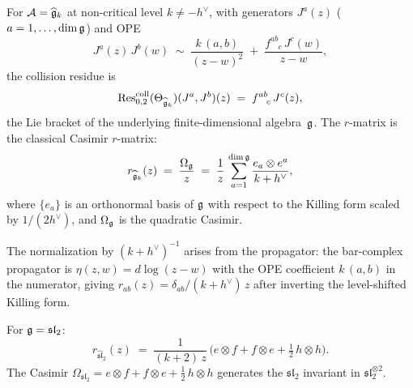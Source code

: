 \begin{computation}
For $\mathcal{A} = \widehat{\mathfrak{g}}_k$ at non-critical level
$k \neq -h^\vee$, with generators $J^a(z)$ ($a = 1,\dotsc,
\dim\mathfrak{g}$) and OPE
\[
J^a(z)\,J^b(w)
\;\sim\;
\frac{k\,(a,b)}{(z-w)^2}
\;+\;
\frac{f^{ab}_{\phantom{ab}c}\,J^c(w)}{z-w},
\]
the collision residue is
\begin{equation}%
\Rescoll_{0,2}(\Theta_{\widehat{\fg}_k})
 (J^a, J^b)(z)
\;=\;
f^{ab}_{\phantom{ab}c}\,J^c(z),
\end{equation}
the Lie bracket of the underlying finite-dimensional algebra~$\mathfrak{g}$.
The $r$-matrix is the classical Casimir $r$-matrix:
\begin{equation}%
r_{\widehat{\fg}_k}(z)
\;=\;
\frac{\Omega_\fg}{z}
\;=\;
\frac{1}{z}\,
\sum_{a=1}^{\dim\fg}
\frac{e_a \otimes e^a}{k + h^\vee},
\end{equation}
where $\{e_a\}$ is an orthonormal basis of $\mathfrak{g}$ with respect to the
Killing form scaled by $1/(2h^\vee)$, and $\Omega_{\mathfrak{g}}$ is the
quadratic Casimir.

The normalization by $(k + h^\vee)^{-1}$ arises from the propagator:
the bar-complex propagator is $\eta(z,w) = d\log(z - w)$ with the
OPE coefficient $k\,(a,b)$ in the numerator, giving
$r_{ab}(z) = \delta_{ab}/(k + h^\vee)\,z$ after inverting the
level-shifted Killing form.

For $\mathfrak{g} = \mathfrak{sl}_2$:
\begin{equation}%
r_{\widehat{\mathfrak{sl}}_2}(z)
\;=\;
\frac{1}{(k+2)\,z}\,
\bigl(e \otimes f + f \otimes e + \tfrac{1}{2}\,h \otimes h\bigr).
\end{equation}
The Casimir $\Omega_{\mathfrak{sl}_2} =
e \otimes f + f \otimes e + \frac{1}{2}\,h \otimes h$
generates the $\mathfrak{sl}_2$ invariant in
$\mathfrak{sl}_2^{\otimes 2}$.
\end{computation}


